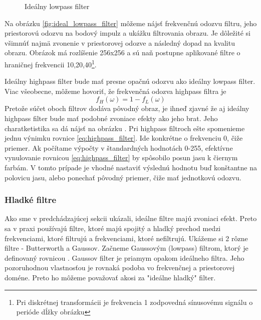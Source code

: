 \begin{figure}[htp]
    \def\path{obrazky/informatika/digitalne_filtre}
    \centering
    \caption{Ideálny lowpass filter}
    \label{fig:ideal_lowpass_image}
\end{figure}
Na obrázku \ref{fig:ideal_lowpass_filter} môžeme nájsť
frekvenčnú odozvu filtru, jeho priestorovú odozvu na bodový impulz a
ukážku filtrovania obrazu. Je dôležité si všimnúť najmä zvonenie v
priestorovej odozve a následný dopad na kvalitu obrazu. Obrázok má
rozlíšenie 256x256 a sú naň postupne aplikované filtre o hraničnej
frekvencii 10,20,40\footnote{Pri diskrétnej transformácii je
frekvencia 1 zodpovedná sínusovému signálu o perióde dĺžky obrázku}.

Ideálny highpass filter bude mať presne opačnú odozvu ako ideálny
lowpass filter. Viac všeobecne, môžeme hovoriť, že frekvenčná odozva
highpass filtra je
\begin{equation}
    f_H(\omega) = 1 - f_L(\omega)
    \label{eq:highpass_filter}
\end{equation}
Pretože súčet oboch filtrov dodáva pôvodný obraz, je ihneď zjavné že
aj ideálny highpass filter bude mať podobné zvoniace efekty ako jeho
brat. Jeho charatketistika sa dá nájsť na obrázku .
Pri highpass filtroch ešte spomenieme jednu výnimku rovnice
\ref{eq:highpass_filter}. Ide konkrétne o frekvenciu 0, čiže priemer.
Ak počítame výpočty v štandardných hodnotách 0-255, efektívne
vynulovanie rovnicou \ref{eq:highpass_filter} by spôsobilo posun jasu
k čiernym farbám. V tomto prípade je vhodné nastaviť výslednú hodnotu
buď konštantne na polovicu jasu, alebo ponechať pôvodný priemer, čiže
mať jednotkovú odozvu.

\subsubsection{Hladké filtre}
Ako sme v predchádzajúcej sekcii ukázali, ideálne filtre majú zvoniaci
efekt. Preto sa v praxi používajú filtre, ktoré majú spojitý a hladký
prechod medzi frekvenciami, ktoré filtrujú a frekvenciami, ktoré
nefiltrujú. Ukážeme si 2 rôzne filtre - Butterworth a Gaussov.
Začneme Gaussovým (lowpass) filtrom, ktorý je definovaný rovnicou
.
Gaussov filter je priamym opakom ideálneho filtra. Jeho pozoruhodnou
vlastnosťou je rovnaká podoba vo frekvenčnej a priestorovej doméne.
Preto ho môžeme považovať akosi za "ideálne hladký" filter.




